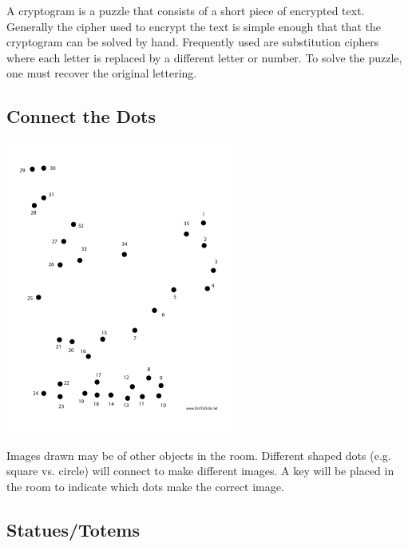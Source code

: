 \documentclass[12pt]{article}
\begin{document}
A cryptogram is a puzzle that consists of a short piece of encrypted text. Generally the cipher used to encrypt the text is simple enough that that the cryptogram can be solved by hand. Frequently used are substitution ciphers where each letter is replaced by a different letter or number. To solve the puzzle, one must recover the original lettering.

\subsection{Connect the Dots}
\label{sec:org5c84eb1}

\begin{center}
\includegraphics[width=.9\linewidth]{./img/connect.png}
\end{center}

Images drawn may be of other objects in the room. Different shaped dots (e.g. square vs. circle) will connect to make different images. A key will be placed in the room to indicate which dots make the correct image.

\subsection{Statues/Totems}
\label{sec:org2ee60f5}
\end{document}
